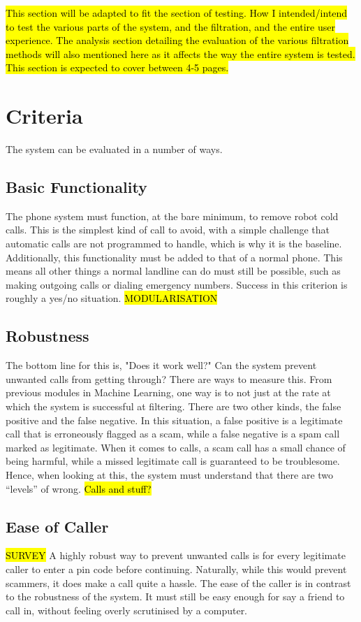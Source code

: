 \documentclass[main.tex]{subfiles}
\begin{document}
\hl{This section will be adapted to fit the section of testing. How I intended/intend to test the various parts of the system, and the filtration, and the entire user experience. The analysis section detailing the evaluation of the various filtration methods will also mentioned here as it affects the way the entire system is tested. This section is expected to cover between 4-5 pages. }

\section{Criteria}
The system can be evaluated in a number of ways.

\subsection{Basic Functionality}
The phone system must function, at the bare minimum, to remove robot cold calls. This is the simplest kind of call to avoid, with a simple challenge that automatic calls are not programmed to handle, which is why it is the baseline. Additionally, this functionality must be added to that of a normal phone. This means all other things a normal landline can do must still be possible, such as making outgoing calls or dialing emergency numbers. Success in this criterion is roughly a yes/no situation.
\hl{MODULARISATION}


\subsection{Robustness}
The bottom line for this is, "Does it work well?" Can the system prevent unwanted calls from getting through? There are ways to measure this. From previous modules in Machine Learning, one way is to not just at the rate at which the system is successful at filtering. There are two other kinds, the false positive and the false negative. In this situation, a false positive is a legitimate call that is erroneously flagged as a scam, while a false negative is a spam call marked as legitimate. When it comes to calls, a scam call has a small chance of being harmful, while a missed legitimate call is guaranteed to be troublesome. Hence, when looking at this, the system must understand that there are two ``levels'' of wrong. \hl{Calls and stuff?}

\subsection{Ease of Caller}
\hl{SURVEY}
A highly robust way to prevent unwanted calls is for every legitimate caller to enter a pin code before continuing. Naturally, while this would prevent scammers, it does make a call quite a hassle. The ease of the caller is in contrast to the robustness of the system. It must still be easy enough for say a friend to call in, without feeling overly scrutinised by a computer.
\end{document}
